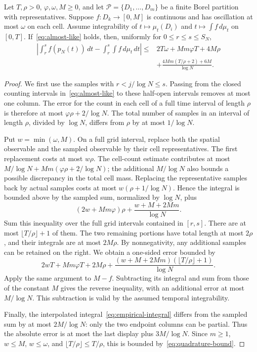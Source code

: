 \begin{lemma}\label{lem:scalar-quadrature}
Let $T,\rho>0$, $\varphi,\omega,M\ge0$, and let
$\mathcal P=\{D_1,\ldots,D_m\}$ be a finite Borel partition with
representatives. Suppose $f:D_k\to[0,M]$ is continuous and has
oscillation at most $\omega$ on each cell. Assume integrability of
$t\mapsto\mu_t(D_i)$ and $t\mapsto\int f\,d\mu_t$ on $[0,T]$.
If~\eqref{eq:almost-like} holds, then, uniformly for
$0\le r\le s\le S_N$,
\begin{align}\label{eq:quadrature-bound}
 \left|\int_r^s f(p_N(t))\,dt-
              \int_r^s\int f\,d\mu_t\,dt\right|
 \le{}&2T\omega+Mm\varphi T+4M\rho\nonumber\\
 &+\frac{4Mm(T/\rho+2)+6M}{\log N}.
\end{align}
\end{lemma}

\begin{proof}
We first use the samples with $r<j/\log N\le s$. Passing from the
closed counting intervals in~\eqref{eq:almost-like} to these
half-open intervals removes at most one column. The error for the
count in each cell of a full time interval of length $\rho$ is
therefore at most $\varphi\rho+2/\log N$. The total number of samples
in an interval of length $\rho$, divided by $\log N$, differs from
$\rho$ by at most $1/\log N$.

Put $w=\min(\omega,M)$. On a full grid interval, replace both the
spatial observable and the sampled observable by their cell
representatives. The first replacement costs at most $w\rho$.
The cell-count estimate contributes at most
$M/\log N+Mm(\varphi\rho+2/\log N)$; the additional
$M/\log N$ also bounds a possible discrepancy in the total cell
mass. Replacing the representative samples back by actual samples
costs at most $w(\rho+1/\log N)$. Hence the integral is bounded above
by the sampled sum, normalized by $\log N$, plus
\[
 (2w+Mm\varphi)\rho+\frac{w+M+2Mm}{\log N}.
\]
Sum this inequality over the full grid intervals contained in
$[r,s]$. There are at most $\lfloor T/\rho\rfloor+1$ of them.
The two remaining portions have total length at most $2\rho$,
and their integrals are at most $2M\rho$. By nonnegativity, any
additional samples can be retained on the right. We obtain a
one-sided error bounded by
\[
 2wT+Mm\varphi T+2M\rho+
 \frac{(w+M+2Mm)(\lfloor T/\rho\rfloor+1)}{\log N}.
\]
Apply the same argument to $M-f$. Subtracting its integral and sum
from those of the constant $M$ gives the reverse inequality, with
an additional error at most $M/\log N$. This subtraction is valid
by the assumed temporal integrability.

Finally, the interpolated integral~\eqref{eq:empirical-integral}
differs from the sampled sum by at most $2M/\log N$: only the two
endpoint columns can be partial. Thus the absolute error is at most
the last display plus $3M/\log N$. Since $m\ge1$, $w\le M$,
$w\le\omega$, and $\lfloor T/\rho\rfloor\le T/\rho$, this is
bounded by~\eqref{eq:quadrature-bound}.
\end{proof}

